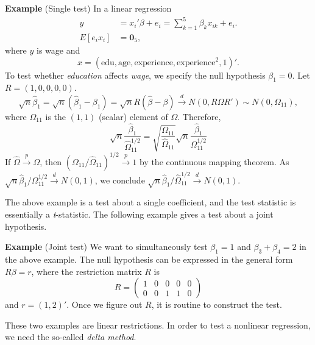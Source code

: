\documentclass[11pt]{article}
\begin{document}
    \textbf{Example} (Single test) In a linear regression \[\begin{aligned}
y & =  x_{i}'\beta+e_{i}=\sum_{k=1}^{5}\beta_{k}x_{ik}+e_{i}.\nonumber \\
E\left[e_{i}x_{i}\right] & =  \mathbf{0}_{5},\label{eq:example}\end{aligned}
\] where \(y\) is wage and
\[x=\left(\mbox{edu},\mbox{age},\mbox{experience},\mbox{experience}^{2},1\right)'.\]
To test whether \emph{education} affects \emph{wage}, we specify the
null hypothesis \(\beta_{1}=0\). Let \(R=\left(1,0,0,0,0\right)\).
\[\sqrt{n}\widehat{\beta}_{1}=\sqrt{n}\left(\widehat{\beta}_{1}-\beta_{1}\right)=\sqrt{n}R\left(\widehat{\beta}-\beta\right)\stackrel{d}{\to}N\left(0,R\Omega R'\right)\sim N\left(0,\Omega_{11}\right),\label{eq:R11}\]
where \(\Omega{}_{11}\) is the \(\left(1,1\right)\) (scalar) element of
\(\Omega\). Therefore,
\[\sqrt{n}\frac{\widehat{\beta}_{1}}{\widehat{\Omega}_{11}^{1/2}}=\sqrt{\frac{\Omega_{11}}{\widehat{\Omega}_{11}}}\sqrt{n}\frac{\widehat{\beta}_{1}}{\Omega_{11}^{1/2}}\]
If \(\widehat{\Omega}\stackrel{p}{\to}\Omega\), then
\(\left(\Omega_{11}/\widehat{\Omega}_{11}\right)^{1/2}\stackrel{p}{\to}1\)
by the continuous mapping theorem. As
\(\sqrt{n}\widehat{\beta}_{1}/\Omega_{11}^{1/2}\stackrel{d}{\to}N\left(0,1\right)\),
we conclude
\(\sqrt{n}\widehat{\beta}_{1}/\widehat{\Omega}_{11}^{1/2}\stackrel{d}{\to}N\left(0,1\right).\)

    The above example is a test about a single coefficient, and the test
statistic is essentially a \emph{t}-statistic. The following example
gives a test about a joint hypothesis.

\textbf{Example} (Joint test) We want to simultaneously test
\(\beta_{1}=1\) and \(\beta_{3}+\beta_{4}=2\) in the above example. The
null hypothesis can be expressed in the general form \(R\beta=r\), where
the restriction matrix \(R\) is \[R=\begin{pmatrix}1 & 0 & 0 & 0 & 0\\
0 & 0 & 1 & 1 & 0
\end{pmatrix}\] and \(r=\left(1,2\right)'\). Once we figure out \(R\),
it is routine to construct the test.

    These two examples are linear restrictions. In order to test a nonlinear
regression, we need the so-called \emph{delta method}.
\end{document}
